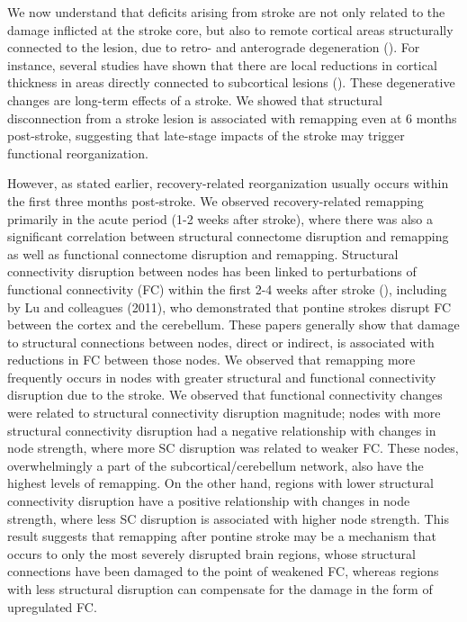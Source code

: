 \documentclass[phd,tocprelim]{cornell}
\begin{document}
	We now understand that deficits arising from stroke are not only related to the damage inflicted at the stroke core, but also to remote cortical areas structurally connected to the lesion, due to retro- and anterograde degeneration (\cite{Guggisberg2019-lj}). For instance, several studies have shown that there are local reductions in cortical thickness in areas directly connected to subcortical lesions (\cite{Duering2015-iv, Cheng2015-jq}). These degenerative changes are long-term effects of a stroke. We showed that structural disconnection from a stroke lesion is associated with remapping even at 6 months post-stroke, suggesting that late-stage impacts of the stroke may trigger functional reorganization. 
    
    However, as stated earlier, recovery-related reorganization usually occurs within the first three months post-stroke. We observed recovery-related remapping primarily in the acute period (1-2 weeks after stroke), where there was also a significant correlation between structural connectome disruption and remapping as well as functional connectome disruption and remapping. Structural connectivity disruption between nodes has been linked to perturbations of functional connectivity (FC) within the first 2-4 weeks after stroke (\cite{Griffis2019-cy, Griffis2020-hx, Wodeyar2020-kz}), including by Lu and colleagues (2011), who demonstrated that pontine strokes disrupt FC between the cortex and the cerebellum. These papers generally show that damage to structural connections between nodes, direct or indirect, is associated with reductions in FC between those nodes. We observed that remapping more frequently occurs in nodes with greater structural and functional connectivity disruption due to the stroke. We observed that functional connectivity changes were related to structural connectivity disruption magnitude; nodes with more structural connectivity disruption had a negative relationship with changes in node strength, where more SC disruption was related to weaker FC. These nodes, overwhelmingly a part of the subcortical/cerebellum network, also have the highest levels of remapping. On the other hand, regions with lower structural connectivity disruption have a positive relationship with changes in node strength, where less SC disruption is associated with higher node strength. This result suggests that remapping after pontine stroke may be a mechanism that occurs to only the most severely disrupted brain regions, whose structural connections have been damaged to the point of weakened FC, whereas regions with less structural disruption can compensate for the damage in the form of upregulated FC. 
    
\end{document}
